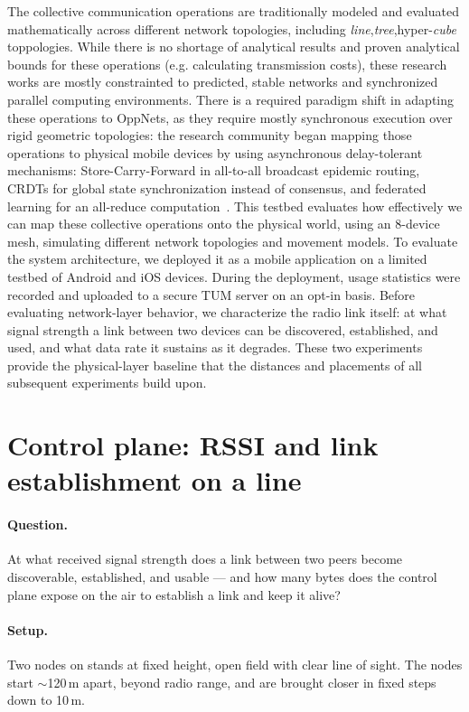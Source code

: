 The collective communication operations are traditionally modeled and evaluated mathematically across different network topologies, including \emph{line},\emph{tree},hyper-\emph{cube} toppologies.
While there is no shortage of analytical results and proven analytical bounds for these operations (e.g. calculating transmission costs), these research works are mostly constrainted to predicted, stable networks and synchronized parallel computing environments.
There is a required paradigm shift in adapting these operations to OppNets, as they require mostly synchronous execution over rigid geometric topologies: the research community began mapping those operations to physical mobile devices by using asynchronous delay-tolerant mechanisms: Store-Carry-Forward in all-to-all broadcast epidemic routing, CRDTs for global state synchronization instead of consensus, and federated learning for an all-reduce computation~\cite{Maheo2023,TranTruong2026}.
This testbed evaluates how effectively we can map these collective operations onto the physical world, using an 8-device mesh, simulating different network topologies and movement models.
To evaluate the system architecture, we deployed it as a mobile application on a limited testbed of Android and iOS devices. During the deployment, usage statistics were recorded and uploaded to a secure TUM server on an opt-in basis.
Before evaluating network-layer behavior, we characterize the radio link itself: at what signal strength a link between two devices can be discovered, established, and used, and what data rate it sustains as it degrades. These two experiments provide the physical-layer baseline that the distances and placements of all subsequent experiments build upon.

\section{Control plane: RSSI and link establishment on a line}

\paragraph{Question.} At what received signal strength does a link between two peers
become discoverable, established, and usable --- and how many bytes does the control
plane expose on the air to establish a link and keep it alive?

\paragraph{Setup.} Two nodes on stands at fixed height, open field with clear line of
sight. The nodes start $\sim$120\,m apart, beyond radio range, and are brought closer
in fixed steps down to 10\,m.

